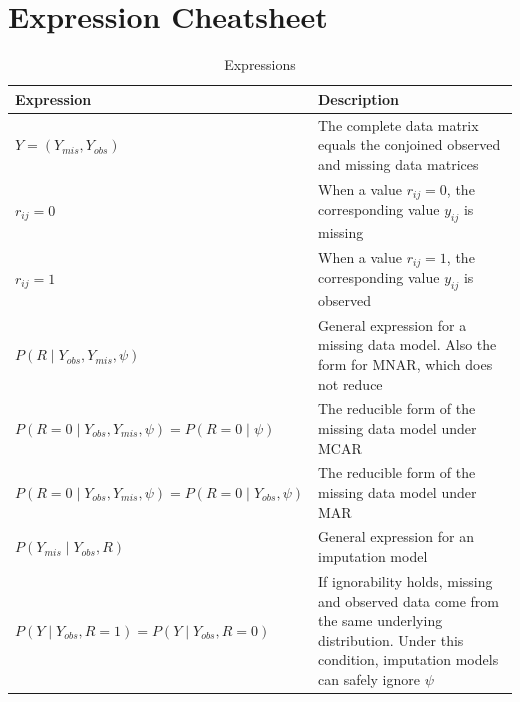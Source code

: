\documentclass[12pt,oneside]{chicagocapstone}
\begin{document}
\chapter{Expression Cheatsheet}\label{expression-cheatsheet}
\begin{table}[!h]

\caption{\label{tab:appendixcexpressions}Expressions}
\begin{tabu} to 
\toprule
\begingroup\fontsize{13}{15}\selectfont \textbf{Expression}\endgroup & \begingroup\fontsize{13}{15}\selectfont \textbf{Description}\endgroup\\
\midrule
$Y = (Y_{mis}, Y_{obs})$ & The complete data matrix equals the conjoined observed and missing data matrices\\
$r_{ij} = 0$ & When a value $r_{ij}=0$, the corresponding value $y_{ij}$ is missing\\
$r_{ij} = 1$ & When a value $r_{ij}=1$, the corresponding value $y_{ij}$ is observed\\
$P(R\mid Y_{obs}, Y_{mis},\psi)$ & General expression for a missing data model. Also the form for MNAR, which does not reduce\\
$P(R=0\mid Y_{obs},Y_{mis},\psi) = P(R=0\mid \psi)$ & The reducible form of the missing data model under MCAR\\
\addlinespace
$P(R=0\mid Y_{obs},Y_{mis},\psi) = P(R=0\mid Y_{obs}, \psi)$ & The reducible form of the missing data model under MAR\\
$P(Y_{mis}\mid Y_{obs}, R)$ & General expression for an imputation model\\
$P(Y\mid Y_{obs}, R=1) = P(Y\mid Y_{obs}, R=0)$ & If ignorability holds, missing and observed data come from the same underlying distribution. Under this condition, imputation models can safely ignore $\psi$\\
\bottomrule
\end{tabu}
\end{table}
\end{document}
